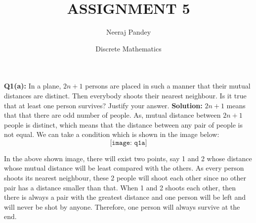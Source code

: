 \documentclass{article}
\title{ASSIGNMENT 5}
\author{Neeraj Pandey}
\date{Discrete Mathematics}
\begin{document}
\maketitle
\begin{flushleft}
\textbf{Q1(a): } In a plane, $2n + 1$ persons are placed in such a manner that their mutual distances are distinct. Then everybody shoots their nearest neighbour. Is it true that at least one person survives? Justify your answer.
\newline
\newline
\textbf{Solution: } $2n + 1$ means that that there are odd number of people. As, mutual distance between $2n + 1$ people is distinct, which means that the distance between any pair of people is not equal. We can take a condition which is shown in the image below:
\[\texttt{[image: q1a]}\]

In the above shown image, there will exist two points, say 1 and 2 whose distance whose mutual distance will be least compared with the others. As every person shoots its nearest neighbour, these 2 people will shoot each other since no other pair has a distance smaller than that. When 1 and 2 shoots each other, then there is always a pair with the greatest distance and one person will be left and will never be shot by anyone. Therefore, one person will always survive at the end.

\end{flushleft}
\end{document}
